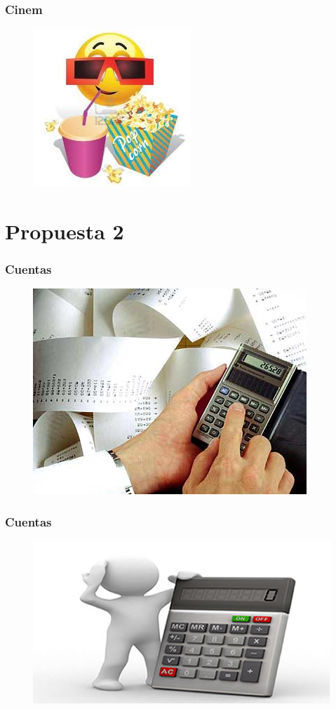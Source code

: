 \documentclass{beamer}
\begin{document}
\begin{frame}[allowframbreaks]
\frametitle{Cinem}
\begin{figure}[h]
\centering
\includegraphics[height=0.5\textheight]{comida.jpg}
\end{figure}
\end{frame}


\section{Propuesta 2}
\begin{frame}[allowframebreaks]
\frametitle{Cuentas}
\begin{figure}[h]
\centering
\includegraphics[height=0.5\textheight]{cuentas.jpg}
\end{figure}
\end{frame}

\begin{frame}[allowframbreaks]
\frametitle{Cuentas}
\begin{figure}[h]
\centering
\includegraphics[height=0.5\textheight]{cuentas1.jpg}
\end{figure}
\end{frame}
\end{document}
